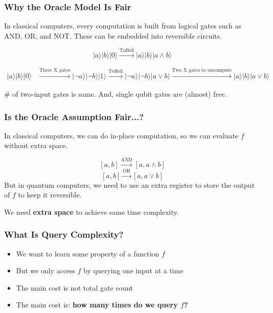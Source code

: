 \documentclass[xcolor=table]{beamer}
\newcommand{\ket}[1]{\lvert #1 \rangle}
\theoremstyle{remark}
\theoremstyle{plain}
\def\\{ }%
\begin{document}
\begin{frame}
  \frametitle{Why the Oracle Model Is Fair}

  In classical computers, every computation is built from logical gates such as AND, OR, and NOT. These can be embedded into reversible circuits.

  \[
    \ket{a}\ket{b}\ket{0} \xrightarrow{\text{Toffoli}} \ket{a}\ket{b}\ket{a \land b}
  \]

  \[
\begin{aligned}
\ket{a}\ket{b}\ket{0} &\xrightarrow{\text{Three X gates}} \ket{\neg a}\ket{\neg b}\ket{1} \xrightarrow{\text{Toffoli}} \ket{\neg a}\ket{\neg b}\ket{a \lor b} \\
&\xrightarrow{\text{Two X gates to uncompute}} \ket{a}\ket{b}\ket{a \lor b}
\end{aligned}
  \]

  \vspace{0.4cm}
  \# of two-input gates is same. And, single qubit gates are (almost) free.

  \vspace{0.4cm}

  \vspace{0.4cm}
\end{frame}



\begin{frame}
  \frametitle{Is the Oracle Assumption Fair...?}

  In classical computers, we can do in-place computation, so we can evaluate $f$ without extra space.
  
  \[
  [a,b] \xrightarrow{\text{AND}} [a, a \land b]
  \]
  \[
  [a,b] \xrightarrow{\text{OR}} [a, a \lor b]
  \]
  But in quantum computers, we need to use an extra register to store the output of $f$ to keep it reversible.

  \vspace{0.5cm}
  We need \textbf{extra space} to achieve same time complexity.
\end{frame}


\begin{frame}
  \frametitle{What Is Query Complexity?}
  \begin{itemize}[<+->]
    \item We want to learn some property of a function $f$
    \item But we only access $f$ by querying one input at a time
    \item The main cost is not total gate count
    \item The main cost is: \textbf{how many times do we query $f$?}
  \end{itemize}

  \vspace{0.5cm}
\end{frame}
\end{document}
